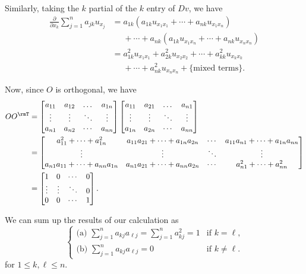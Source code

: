 \begin{solution}
  Similarly, taking the \(k\) partial of the \(k\)
  entry of \(Dv\), we have
  \begin{equation}
    \label{eq:5:laplacian-k-part}
    \begin{aligned}
      \frac{\partial}{\partial x_k}\sum_{j=1}^n a_{jk}u_{x_j}
      &=a_{1k}(a_{1k}u_{x_1x_1}+\dotsb+a_{nk}u_{x_1x_n})\\
      &\phantom{{}={}}+\dotsb+a_{nk}
      (a_{1k}u_{x_1x_n}+\dotsb+a_{nk}u_{x_nx_n})\\
      &=a_{1k}^2u_{x_1x_1}+a_{2k}^2u_{x_2x_2}+\dotsb+a_{kk}^2u_{x_kx_k}\\
      &\phantom{{}={}}+\dotsb+a_{nk}^2u_{x_nx_n}+\{\text{mixed terms}\}.
    \end{aligned}
  \end{equation}

  Now, since \(O\) is orthogonal, we have
  \begin{align*}
    OO^\rmT
    &=%
    \begin{bmatrix}
      a_{11}&a_{12}&\dotsc&a_{1n}\\
      \vdots&\vdots&\ddots&\vdots\\
      a_{n1}&a_{n2}&\cdots&a_{nn}
    \end{bmatrix}
    \begin{bmatrix}
      a_{11}&a_{21}&\dotsc&a_{n1}\\
      \vdots&\vdots&\ddots&\vdots\\
      a_{1n}&a_{2n}&\cdots&a_{nn}
    \end{bmatrix}
    \\
    &=%
      \begin{bmatrix}
        a_{11}^2+\dotsb+a_{1n}^2&a_{11}a_{21}+\dotsb+a_{1n}a_{2n}
        &\cdots&a_{11}a_{n1}+\dotsb+a_{1n}a_{nn}\\
        \vdots&\vdots&\ddots&\vdots\\
        a_{n1}a_{11}+\dotsb+a_{nn}a_{1n}&a_{n1}a_{21}+\dotsb+a_{nn}a_{2n}
        &\cdots&a_{n1}^2+\dotsb+a_{nn}^2
      \end{bmatrix}\\
    &=\begin{bmatrix}
      1&0&\cdots&0\\
      \vdots&\vdots&\ddots&0\\
      0&0&\cdots&1
      \end{bmatrix}.
  \end{align*}

  We can sum up the results of our calculation as
  \begin{equation}
    \label{eq:5:ortho-matrix}
    \begin{cases}
    \text{(a) }\sum_{j=1}^na_{kj}a_{\ell j}=\sum_{j=1}^na_{kj}^2=1&\text{if \(k=\ell\),}\\
    \text{(b) }\sum_{j=1}^na_{kj}a_{\ell j}=0&\text{if \(k\neq\ell\).}
    \end{cases}
  \end{equation}
  for \(1\leq k,\ell\leq n\).


\end{solution}
